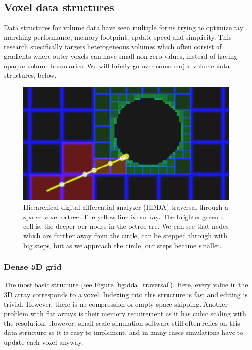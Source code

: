 \subsection{Voxel data structures} \label{related_work:voxel_data_structures}
Data structures for volume data have seen multiple forms trying to optimize ray marching performance, memory footprint, update speed and simplicity. This research specifically targets heterogeneous volumes which often consist of gradients where outer voxels can have small non-zero values, instead of having opaque volume boundaries. We will briefly go over some major volume data structures, below.

\begin{figure}
    \centering
    \includegraphics[width=\linewidth]{figures/esvo_traversal.png}
    \caption{Hierarchical digital differential analyzer (HDDA) traversal through a sparse voxel octree. The yellow line is our ray. The brighter green a cell is, the deeper our nodes in the octree are. We can see that nodes which are further away from the circle, can be stepped through with big steps, but as we approach the circle, our steps become smaller. \cite{ShaderToyQuadtree}}
    \label{fig:esvo}
\end{figure}




\subsubsection{Dense 3D grid} \label{related_work:voxel_data_structures:dense_grid}
The most basic structure (see Figure \ref{fig:dda_traversal}). Here, every value in the 3D array corresponds to a voxel. Indexing into this structure is fast and editing is trivial. However, there is no compression or empty space skipping. Another problem with flat arrays is their memory requirement as it has cubic scaling with the resolution. However, small scale simulation software still often relies on this data structure as it is easy to implement, and in many cases simulations have to update each voxel anyway.



